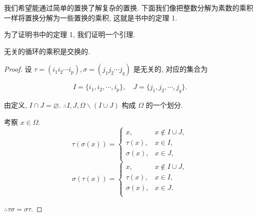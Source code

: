 \documentclass{ctexart}
\begin{document}
我们希望能通过简单的置换了解复杂的置换. 下面我们像把整数分解为素数的乘积一样将置换分解为一些置换的乘积, 这就是书中的定理 1.

为了证明书中的定理 1, 我们证明一个引理.
\begin{lemma}\label{l1.3}
    无关的循环的乘积是交换的.
\end{lemma}
\begin{proof}
    设 $\tau=(i_1i_2\cdots i_p),\sigma=(j_1j_2\cdots j_q)$ 是无关的, 对应的集合为
    
    \[I=\{i_1,i_2,\cdots,i_p\},\quad J=\{j_1,j_2,\cdots,j_q\}.\]

    由定义, $I\cap J=\varnothing$. $\therefore I,J,\Omega\backslash(I\cup J)$ 构成 $\Omega$ 的一个划分.

    考察 $x\in\Omega$.
    \[\tau(\sigma(x))=\begin{cases}
        x, & x\notin I\cup J, \\
        \tau(x), & x\in I, \\
        \sigma(x), & x\in J, \\
    \end{cases}\]
    \[\sigma(\tau(x))=\begin{cases}
        x, & x\notin I\cup J, \\
        \tau(x), & x\in I, \\
        \sigma(x), & x\in J. \\
    \end{cases}\]
    
    $\therefore\tau\sigma=\sigma\tau$.
\end{proof}
\end{document}
